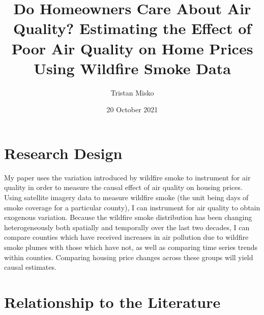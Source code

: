 \documentclass[12pt]{article}
\title{\vspace{-2cm}\Large{Do Homeowners Care About Air Quality? Estimating the Effect of Poor Air Quality on Home Prices Using Wildfire Smoke Data}\\ \vspace{0.1cm}{\large\textit{Literature Review}}}
\author{\normalsize Tristan Misko}
\date{\normalsize{20 October 2021}}
\begin{document}
	\maketitle
	\doublespacing




\section{Research Design}

My paper uses the variation introduced by wildfire smoke to instrument for air quality in order to measure the causal effect of air quality on housing prices.  Using satellite imagery data to measure wildfire smoke (the unit being days of smoke coverage for a particular county), I can instrument for air quality to obtain exogenous variation.  Because the wildfire smoke distribution has been changing heterogeneously both spatially and temporally over the last two decades, I can compare counties which have received increases in air pollution due to wildfire smoke plumes with those which have not, as well as comparing time series trends within counties.  Comparing housing price changes across these groups will yield causal estimates. 

\section{Relationship to the Literature}
\end{document}
